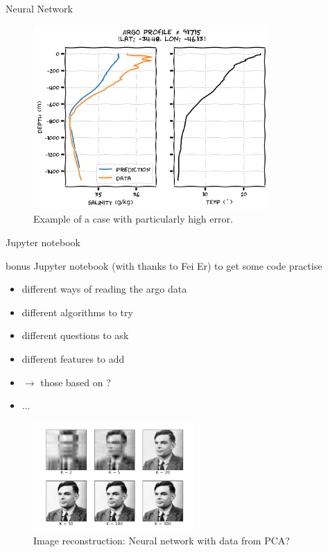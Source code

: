 \documentclass[xcolor=x11names,compress]{beamer}
\renewcommand{\(}{\begin{columns}}
\renewcommand{\)}{\end{columns}}
\newcommand{\<}[1]{\begin{column}{#1}}
\renewcommand{\>}{\end{column}}
\begin{document}
\begin{frame}{Neural Network}

\begin{figure}
  \includegraphics[width=0.8\textwidth]{argo_data_neural_network_bad_case}
  \caption{Example of a case with particularly high error.}
\end{figure}

\end{frame}


\begin{frame}{Jupyter notebook}

bonus Jupyter notebook {\tiny (with thanks to Fei Er)} to get some code practise

\medskip

\parbox{0.45\textwidth}{
\begin{itemize}
  \item different ways of reading the argo data
  \item different algorithms to try
  \item different questions to ask
  \item different features to add
  \item[] $\to$ those based on ?
  \item $\ldots$
\end{itemize}
}\parbox{0.55\textwidth}{
\begin{figure}
  \includegraphics[width=0.55\textwidth]{turing_PCA}
  \caption{Image reconstruction: Neural network with data from PCA?}
\end{figure}
}

\end{frame}



  
\end{document}
